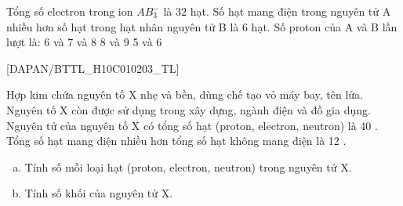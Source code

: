 \begin{ex}[3]
	Tổng số electron trong ion $ AB_{3}^{-} $ là $ 32 $ hạt. Số hạt mang điện trong nguyên tử A nhiều hơn số hạt trong hạt nhân nguyên tử B là 6 hạt. Số proton của A và B lần lượt là:
	\choice
	{%
		6 và 7
	}
	{%
	 và 8
	}
	{%
		8 và 9
	}
	{%
		5 và 6
	}
\end{ex}
[DAPAN/BTTL_H10C010203_TL]
\begin{btex}
	Hợp kim chứa nguyên tố $\mathrm{X}$ nhẹ và bền, dùng chế tạo vỏ máy bay, tên lửa. Nguyên tố $\mathrm{X}$ còn được sử dụng trong xây dựng, ngành điện và đồ gia dụng. Nguyên tử của nguyên tố $\mathrm{X}$ có tổng số hạt (proton, electron, neutron) là 40 . Tổng số hạt mang điện nhiều hơn tổng số hạt không mang điện là 12 .
\begin{enumerate}[a)]
\item Tính số mỗi loại hạt (proton, electron, neutron) trong nguyên tử $\mathrm{X}$.
\item Tính số khối của nguyên tử $\mathrm{X}$.
\end{enumerate}
\end{btex}

\newpage
